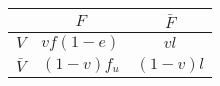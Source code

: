 \begin{tabular}{ccc}
\toprule
 & $F$ & $\bar{F}$ \\
\midrule
$V$ & $vf(1-e)$ & $vl$ \\
$\bar{V}$ & $(1-v)f_u$ & $(1-v)l$ \\
\bottomrule
\end{tabular}